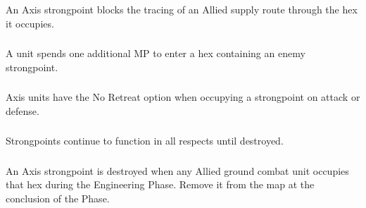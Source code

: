 \subsubsection{} An Axis strongpoint blocks the tracing of an Allied supply route through the hex it occupies.

\subsubsection{} A unit spends one additional MP to enter a hex containing an enemy strongpoint.

\subsubsection{} Axis units have the No Retreat option when occupying a strongpoint on attack or defense.

\subsubsection{} Strongpoints continue to function in all respects until destroyed.

\subsubsection{} An Axis strongpoint is destroyed when any Allied ground combat unit occupies that hex during the Engineering Phase. Remove it from the map at the conclusion of the Phase.